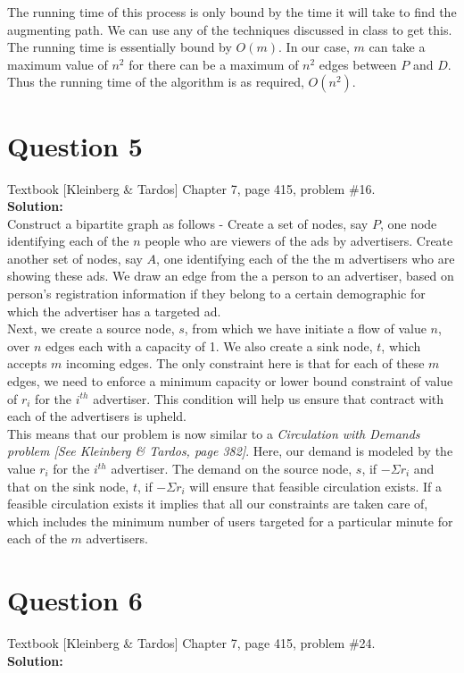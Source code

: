 \documentclass[11pt]{article}
\begin{document}
The running time of this process is only bound by the time it will take to find the augmenting path. We can use any of the techniques discussed in class to get this. The running time is essentially bound by $ O(m) $. In our case, $ m $ can take a maximum value of $ n^2 $ for there can be a maximum of $ n^2 $ edges between $ P $ and $ D $. Thus the running time of the algorithm is as required, $ O(n^2) $.

\clearpage
\section{Question 5} Textbook [Kleinberg \& Tardos] Chapter 7, page 415, problem \#16. \\
\textbf{Solution:} \\

Construct a bipartite graph as follows - Create a set of nodes, say $ P $, one node identifying each of the $ n $ people who are viewers of the ads by advertisers. Create another set of nodes, say $ A $, one identifying each of the the m advertisers who are showing these ads. We draw an edge from the a person to an advertiser, based on person's registration information if they belong to a certain demographic for which the advertiser has a targeted ad. \\

Next, we create a source node, $ s $, from which we have initiate a flow of value $ n $, over $ n $ edges each with a capacity of 1. We also create a sink node, $ t $, which accepts $ m $ incoming edges. The only constraint here is that for each of these $ m $ edges, we need to enforce a minimum capacity or lower bound constraint of value of $ r_i $ for the $ i^{th} $ advertiser. This condition will help us ensure that contract with each of the advertisers is upheld. \\

This means that our problem is now similar to a \textit{Circulation with Demands problem [See Kleinberg \& Tardos, page 382]}. Here, our demand is modeled by the value $ r_i $ for the $ i^{th} $ advertiser.
The demand on the source node, $ s $, if $ -\Sigma r_i $ and that on the sink node, $ t $, if $ -\Sigma r_i $ will ensure that feasible circulation exists. If a feasible circulation exists it implies that all our constraints are taken care of, which includes the minimum number of users targeted for a particular minute for each of the $ m $ advertisers.

\clearpage
\section{Question 6} Textbook [Kleinberg \& Tardos] Chapter 7, page 415, problem \#24. \\
\textbf{Solution:} \\
\end{document}
